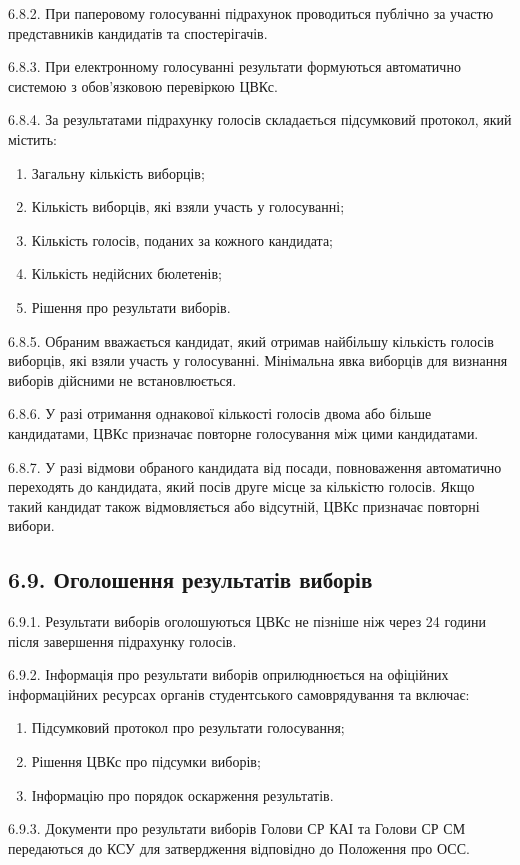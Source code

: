     6.8.2. При паперовому голосуванні підрахунок проводиться публічно за участю представників кандидатів та спостерігачів.

    6.8.3. При електронному голосуванні результати формуються автоматично системою з обов'язковою перевіркою ЦВКс.

    6.8.4. За результатами підрахунку голосів складається підсумковий протокол, який містить:

        \begin{enumerate}[label=\alph*)]
            \item Загальну кількість виборців;
            \item Кількість виборців, які взяли участь у голосуванні;
            \item Кількість голосів, поданих за кожного кандидата;
            \item Кількість недійсних бюлетенів;
            \item Рішення про результати виборів.
        \end{enumerate}

    6.8.5. Обраним вважається кандидат, який отримав найбільшу кількість голосів виборців, які взяли участь у голосуванні. Мінімальна явка виборців для визнання виборів дійсними не встановлюється.

    6.8.6. У разі отримання однакової кількості голосів двома або більше кандидатами, ЦВКс призначає повторне голосування між цими кандидатами.

    6.8.7. У разі відмови обраного кандидата від посади, повноваження автоматично переходять до кандидата, який посів друге місце за кількістю голосів. Якщо такий кандидат також відмовляється або відсутній, ЦВКс призначає повторні вибори.

\subsection*{6.9. Оголошення результатів виборів}
    6.9.1. Результати виборів оголошуються ЦВКс не пізніше ніж через 24 години після завершення підрахунку голосів.

    6.9.2. Інформація про результати виборів оприлюднюється на офіційних інформаційних ресурсах органів студентського самоврядування та включає:

        \begin{enumerate}[label=\alph*)]
            \item Підсумковий протокол про результати голосування;
            \item Рішення ЦВКс про підсумки виборів;
            \item Інформацію про порядок оскарження результатів.
        \end{enumerate}

    6.9.3. Документи про результати виборів Голови СР КАІ та Голови СР СМ передаються до КСУ для затвердження відповідно до Положення про ОСС.